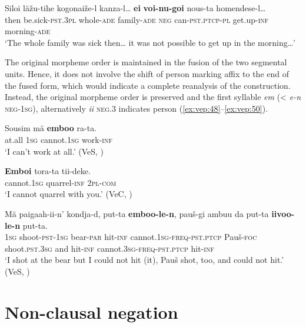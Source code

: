 \documentclass[output=paper,colorlinks=true, citecolor=brown]{langscibook}
\begin{document}
\ea
    \label{ex:vep:47}
    \gll Siloi läžu-tihe  kogonaiže-l kanza-l… \textbf{ei}  \textbf{voi-nu-goi}  nous{}-ta homendese{}-l…\\
         then be.sick-\textsc{pst}.3\textsc{pl}  whole-\textsc{ade} family-\textsc{ade} \textsc{neg}  can-\textsc{pst.ptcp}{}-\textsc{pl} get.up\textsc{{}-inf} morning-\textsc{ade}\\
    \glt ‘The whole family was sick then… it was not possible to get up in the morning…’
\z

The original morpheme order is maintained in the fusion of the two segmental units. Hence, it does not involve the shift of person marking affix to the end of the fused form, which would indicate a complete reanalysis of the construction. Instead, the original morpheme order is preserved and the first syllable \textit{em} (< \textit{e-n} \textsc{neg-1sg}), alternatively \textit{ii} \textsc{neg.3} indicates person (\ref{ex:vep:48}–\ref{ex:vep:50}).

\ea
    \label{ex:vep:48}
    \gll Sousim mä \textbf{emboo} ra-ta. \\
         at.all \textsc{1sg} cannot.\textsc{1sg} work\textsc{{}-inf} \\
    \glt ‘I can’t work at all.’ (VeS, \citealt[78]{Kettunen1920})
\z

\ea
    \label{ex:vep:49}
    \gll \textbf{Emboi}  tora-ta tii-deke.\\
        cannot.\textsc{1sg} quarrel\textsc{{}-inf} \textsc{2pl-com}\\
    \glt ‘I cannot quarrel with you.’ (VeC, \citealt[92]{MSFOu70})
\z 

\ea
    \label{ex:vep:50}
    \gll Mä paigaah-ii-n’ kondja-d, put-ta \textbf{emboo-le{}-n},  pauš-gi ambuu da put-ta \textbf{iivoo-le{}-n}  put-ta.   \\
         \textsc{1sg} shoot-\textsc{pst}{}-\textsc{1sg} bear-\textsc{par} hit\textsc{{}-inf} cannot.\textsc{1sg-freq}{}-\textsc{pst.ptcp} Pauš-\textsc{foc} shoot.\textsc{pst}.\textsc{3sg} and hit\textsc{{}-inf} cannot.\textsc{3sg}-\textsc{freq}-\textsc{pst.ptcp} hit\textsc{{}-inf}  \\
    \glt ‘I shot at the bear but I could not hit (it), Pauš shot, too, and could not hit.’ (VeS, \citealt[105]{Kettunen1920})
\z

\section{Non-clausal negation}\label{sec:vep:3}
\end{document}
